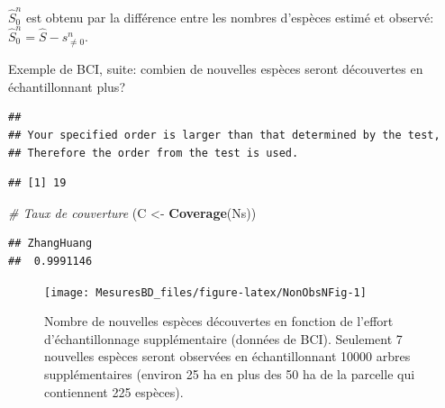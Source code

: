 \documentclass[
  11pt,
  french,
  a4paper,
  extrafontsizes,onecolumn,openright
  ]{memoir}
\newenvironment{Shaded}{\begin{snugshade}}{\end{snugshade}}
\newcommand{\CommentTok}[1]{\textcolor[rgb]{0.56,0.35,0.01}{\textit{#1}}}
\newcommand{\KeywordTok}[1]{\textcolor[rgb]{0.13,0.29,0.53}{\textbf{#1}}}
\newcommand{\NormalTok}[1]{#1}
\newcommand{\OperatorTok}[1]{\textcolor[rgb]{0.81,0.36,0.00}{\textbf{#1}}}
\newcommand{\StringTok}[1]{\textcolor[rgb]{0.31,0.60,0.02}{#1}}
\begin{document}
\(\hat{S}^{n}_{0}\) est obtenu par la différence entre les nombres d'espèces estimé et observé: \(\hat{S}^{n}_{0}=\hat{S}-s^{n}_{\ne 0}\).

Exemple de BCI, suite: combien de nouvelles espèces seront découvertes en échantillonnant plus?

\scriptsize

\begin{Shaded}
\end{Shaded}

\begin{verbatim}
## 
## Your specified order is larger than that determined by the test, 
## Therefore the order from the test is used.
\end{verbatim}

\begin{verbatim}
## [1] 19
\end{verbatim}

\begin{Shaded}
\begin{Highlighting}[]
\CommentTok{# Taux de couverture}
\NormalTok{(C <-}\StringTok{ }\KeywordTok{Coverage}\NormalTok{(Ns))}
\end{Highlighting}
\end{Shaded}

\begin{verbatim}
## ZhangHuang 
##  0.9991146
\end{verbatim}

\normalsize



\scriptsize

\begin{figure}

{\centering \texttt{[image: MesuresBD\_files/figure-latex/NonObsNFig-1]} 

}

\caption{Nombre de nouvelles espèces découvertes en fonction de l'effort d'échantillonnage supplémentaire (données de BCI). Seulement 7 nouvelles espèces seront observées en échantillonnant 10000 arbres supplémentaires (environ 25 ha en plus des 50 ha de la parcelle qui contiennent 225 espèces).}\label{fig:NonObsNFig}
\end{figure}
\end{document}
